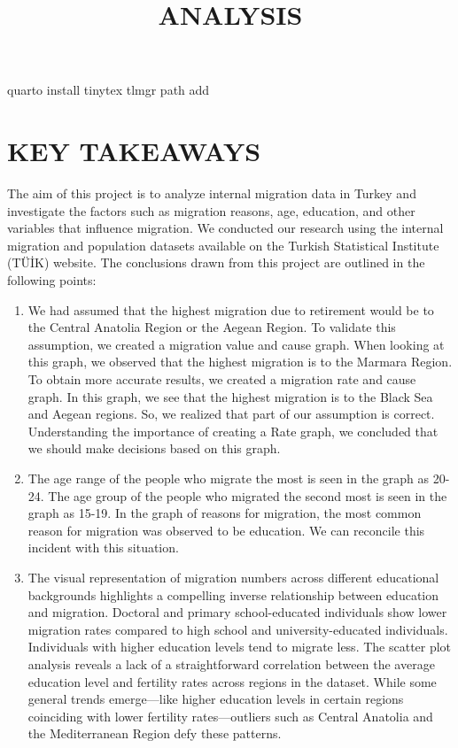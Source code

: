 \documentclass[
  11pt,
  a4paper,
  DIV=11,
  numbers=noendperiod]{scrartcl}
\title{ANALYSIS}
\author{}
\date{}
\begin{document}
\maketitle
\ifdefined\Shaded\renewenvironment{Shaded}{\begin{tcolorbox}[frame hidden, sharp corners, breakable, interior hidden, enhanced, borderline west={3pt}{0pt}{shadecolor}, boxrule=0pt]}{\end{tcolorbox}}\fi

quarto install tinytex tlmgr path add

\hypertarget{key-takeaways}{%
\section{KEY TAKEAWAYS}\label{key-takeaways}}

The aim of this project is to analyze internal migration data in Turkey
and investigate the factors such as migration reasons, age, education,
and other variables that influence migration. We conducted our research
using the internal migration and population datasets available on the
Turkish Statistical Institute (TÜİK) website. The conclusions drawn from
this project are outlined in the following points:

\begin{enumerate}
\def\labelenumi{\arabic{enumi}.}
\item
  We had assumed that the highest migration due to retirement would be
  to the Central Anatolia Region or the Aegean Region. To validate this
  assumption, we created a migration value and cause graph. When looking
  at this graph, we observed that the highest migration is to the
  Marmara Region. To obtain more accurate results, we created a
  migration rate and cause graph. In this graph, we see that the highest
  migration is to the Black Sea and Aegean regions. So, we realized that
  part of our assumption is correct. Understanding the importance of
  creating a Rate graph, we concluded that we should make decisions
  based on this graph.
\item
  The age range of the people who migrate the most is seen in the graph
  as 20-24. The age group of the people who migrated the second most is
  seen in the graph as 15-19. In the graph of reasons for migration, the
  most common reason for migration was observed to be education. We can
  reconcile this incident with this situation.
\item
  The visual representation of migration numbers across different
  educational backgrounds highlights a compelling inverse relationship
  between education and migration. Doctoral and primary school-educated
  individuals show lower migration rates compared to high school and
  university-educated individuals. Individuals with higher education
  levels tend to migrate less. The scatter plot analysis reveals a lack
  of a straightforward correlation between the average education level
  and fertility rates across regions in the dataset. While some general
  trends emerge---like higher education levels in certain regions
  coinciding with lower fertility rates---outliers such as Central
  Anatolia and the Mediterranean Region defy these patterns.
\end{enumerate}
\end{document}
